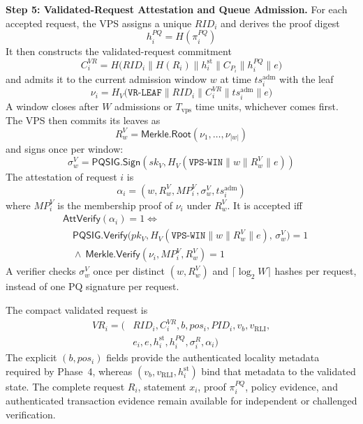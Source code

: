 \documentclass[lettersize,journal]{IEEEtran}
\begin{document}
\smallskip
\textbf{Step 5: Validated-Request Attestation and Queue
Admission.}
For each accepted request, the VPS assigns a unique $RID_i$ and derives
the proof digest
\begin{equation}
h_i^{PQ}=H(\pi_i^{PQ})
\end{equation}
It then constructs the validated-request commitment
\begin{equation}
C_i^{VR}
=
H\big(RID_i\parallel H(R_i)
\parallel h_i^{\mathrm{st}}
\parallel C_{P_i}\parallel h_i^{PQ}
\parallel e\big)
\label{eq:cvr}
\end{equation}
and admits it to the current admission window $w$ at time
$ts_i^{\mathrm{adm}}$ with the leaf
\begin{equation}
\nu_i=
H_V\big(\texttt{VR-LEAF}\parallel RID_i\parallel C_i^{VR}
\parallel ts_i^{\mathrm{adm}}\parallel e\big)
\end{equation}
A window closes after $W$ admissions or $T_{\mathrm{vps}}$
time units, whichever comes first. The VPS then commits its leaves as
\begin{equation}
R_w^{V}=\mathsf{Merkle.Root}(\nu_1,\ldots,\nu_{|w|})
\end{equation}
and signs once per window:
\begin{equation}
\sigma_w^{V}=
\mathsf{PQSIG.Sign}
\left(
sk_V,
H_V(\texttt{VPS-WIN}\parallel w\parallel R_w^{V}\parallel e)
\right)
\end{equation}
The attestation of request $i$ is
\begin{equation}
\alpha_i=(w,R_w^{V},MP_i^{V},\sigma_w^{V},ts_i^{\mathrm{adm}})
\end{equation}
where $MP_i^{V}$ is the membership proof of $\nu_i$ under
$R_w^{V}$. It is accepted iff
\begin{equation}
\begin{aligned}
&\mathsf{AttVerify}(\alpha_i)=1 \iff\\
&\quad \mathsf{PQSIG.Verify}\big(pk_V,H_V(\texttt{VPS-WIN}\parallel w\parallel R_w^{V}\parallel e),\,
\sigma_w^{V}\big)=1\\
&\quad \land\ \mathsf{Merkle.Verify}(\nu_i,MP_i^{V},R_w^{V})=1
\end{aligned}
\label{eq:attverify}
\end{equation}
A verifier checks $\sigma_w^{V}$ once per distinct
$(w,R_w^{V})$ and $\lceil\log_2 W\rceil$ hashes per request, instead of
one PQ signature per request.

The compact validated request is
\begin{equation}
\begin{aligned}
VR_i=\big(&RID_i,C_i^{VR},b,pos_i,PID_i,
v_b,v_{\mathrm{RLI}},\\
&e_i,e,h_i^{\mathrm{st}},h_i^{PQ},
\sigma_i^R,\alpha_i\big)
\end{aligned}
\end{equation}
The explicit $(b,pos_i)$ fields provide the authenticated locality
metadata required by Phase~4, whereas
$(v_b,v_{\mathrm{RLI}},h_i^{\mathrm{st}})$ bind that metadata to the
validated state. The complete request $R_i$, statement $x_i$, proof
$\pi_i^{PQ}$, policy evidence, and authenticated transaction evidence
remain available for independent or challenged verification.
\end{document}
